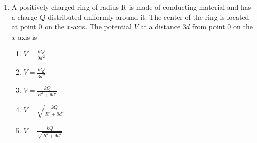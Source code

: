\documentclass[12pt]{article}
\begin{document}
\begin{enumerate}[leftmargin=50pt,label=\underline{\hspace{0.4in}} \arabic*.]
\item A positively charged ring of radius R is made of conducting material and
  has a charge $Q$ distributed uniformly around it. The center of the ring is
  located at point 0 on the $x$-axis. The potential $V$ at a distance $3d$ from
  point 0 on the $x$-axis is
  \begin{enumerate}[noitemsep,topsep=0pt,leftmargin=18pt,label=(\Alph*)]  
  \item $\displaystyle V=\frac{kQ}{9d^2}$
  \item $\displaystyle V=\frac{kQ}{3d^2}$
  \item $\displaystyle V=\frac{kQ}{R^2+9d^2}$
  \item $\displaystyle V=\sqrt{\frac{kQ}{R^2+9d^2}}$
  \item $\displaystyle V=\frac{kQ}{\sqrt{R^2+9d^2}}$
  \end{enumerate}


\end{enumerate}
\end{document}
